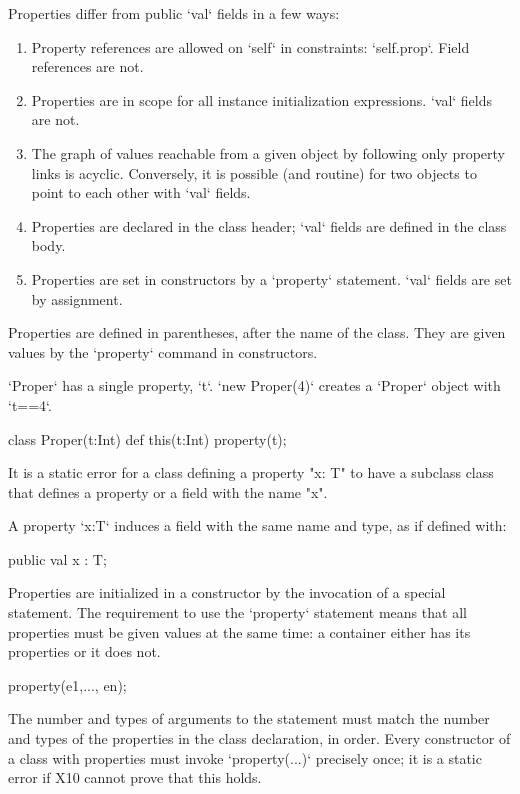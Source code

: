 Properties differ from public \xcd`val` fields in a few ways: 
\begin{enumerate}
\item Property references are allowed on \xcd`self` in constraints:
      \xcd`self.prop`.  Field references are not.
\item Properties are in scope for all instance initialization expressions.
      \xcd`val` fields are not.
\item The graph of values reachable from a given object by following only
      property links is acyclic.  Conversely, it is possible (and routine) for
      two objects to point to each other with \xcd`val` fields.
\item Properties are declared in the class header; \xcd`val` fields are
      defined in the class body.
\item Properties are set in constructors by a \xcd`property` statement.
      \xcd`val` fields are set by assignment.
\end{enumerate}



Properties are defined in parentheses, after the name of the class.  They are
given values by the \xcd`property` command in constructors.

\begin{ex}
\xcd`Proper` has a single property, \xcd`t`.  \xcd`new Proper(4)` creates a
\xcd`Proper` object with \xcd`t==4`. 
\begin{xten}
class Proper(t:Int) {
  def this(t:Int) {property(t);}
}
\end{xten}

\end{ex}


It is a static error for a class
defining a property \xcd"x: T" to have a subclass class that defines
a property or a field with the name \xcd"x".


A property \xcd`x:T` induces a field with the same name and type, 
as if defined with: 
\begin{xten}
public val x : T;
\end{xten} 

Properties are initialized in a constructor by the invocation of a special 
statement. The requirement to use the \xcd`property` statement means that all properties
must be given values at the same time: a container either has its properties
or it does not.
\begin{xten}
property(e1,..., en);
\end{xten}
The number and types of arguments to the  statement must match
the number and types of the properties in the class declaration, in order.  
Every constructor of a class with properties must invoke \xcd`property(...)`
precisely once; it is a static error if X10 cannot prove that this holds.



